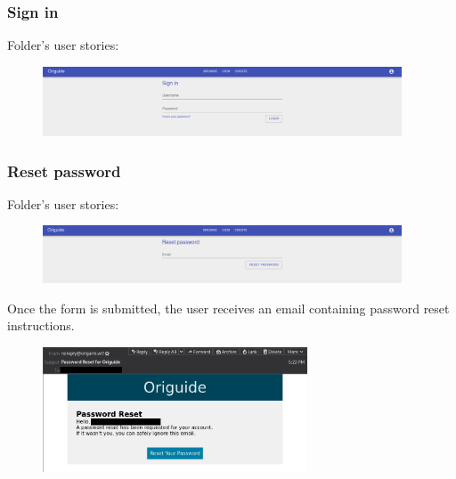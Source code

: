 \subsubsection{Sign in}

Folder's user stories:
\begin{enumerate}
	\setcounter{enumi}{16}
\end{enumerate}

\begin{figure}[H]
  	\centering
    \includegraphics[width=0.95\textwidth]{assets/5-signIn.png}
\end{figure}

\subsubsection{Reset password}

Folder's user stories:
\begin{enumerate}
	\setcounter{enumi}{17}
\end{enumerate}

\begin{figure}[H]
  	\centering
    \includegraphics[width=0.95\textwidth]{assets/5-passwordResetForm.png}
\end{figure}

Once the form is submitted, the user receives an email containing password reset instructions.

\begin{figure}[H]
  	\centering
    \includegraphics[width=0.7\textwidth]{assets/5-passwordResetEmail.png}
\end{figure}

